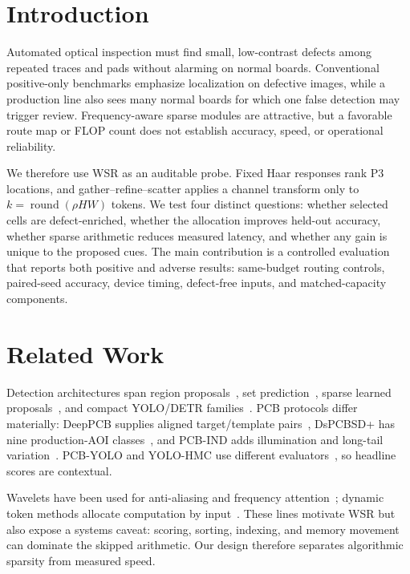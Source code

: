 \documentclass[conference]{IEEEtran}
\begin{document}
\section{Introduction}
Automated optical inspection must find small, low-contrast defects among repeated traces and pads without alarming on normal boards. Conventional positive-only benchmarks emphasize localization on defective images, while a production line also sees many normal boards for which one false detection may trigger review. Frequency-aware sparse modules are attractive, but a favorable route map or FLOP count does not establish accuracy, speed, or operational reliability.

We therefore use WSR as an auditable probe. Fixed Haar responses rank P3 locations, and gather--refine--scatter applies a channel transform only to $k=\operatorname{round}(\rho HW)$ tokens. We test four distinct questions: whether selected cells are defect-enriched, whether the allocation improves held-out accuracy, whether sparse arithmetic reduces measured latency, and whether any gain is unique to the proposed cues. The main contribution is a controlled evaluation that reports both positive and adverse results: same-budget routing controls, paired-seed accuracy, device timing, defect-free inputs, and matched-capacity components.

\section{Related Work}
Detection architectures span region proposals~\cite{fasterrcnn}, set prediction~\cite{detr}, sparse learned proposals~\cite{sparsercnn}, and compact YOLO/DETR families~\cite{yolo11,dfine}. PCB protocols differ materially: DeepPCB supplies aligned target/template pairs~\cite{deeppcb}, DsPCBSD+ has nine production-AOI classes~\cite{dspcbsd}, and PCB-IND adds illumination and long-tail variation~\cite{pcbind}. PCB-YOLO and YOLO-HMC use different evaluators~\cite{pcbyolo,yolohmc}, so headline scores are contextual.

Wavelets have been used for anti-aliasing and frequency attention~\cite{wavecnet,fcanet}; dynamic token methods allocate computation by input~\cite{dynamicvit}. These lines motivate WSR but also expose a systems caveat: scoring, sorting, indexing, and memory movement can dominate the skipped arithmetic. Our design therefore separates algorithmic sparsity from measured speed.
\end{document}
